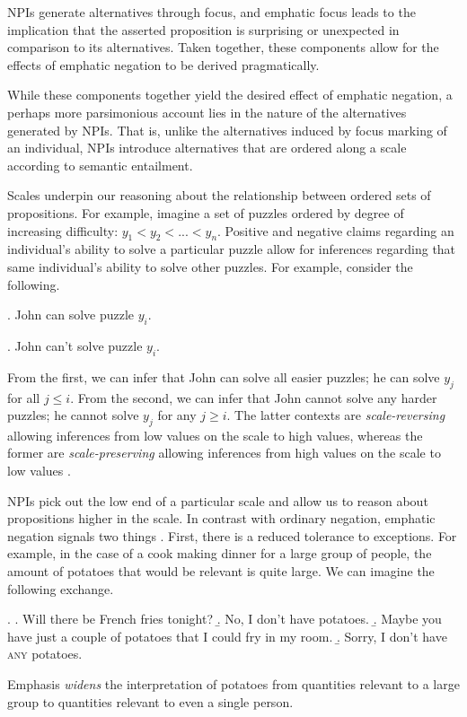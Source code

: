 \documentclass[12pt]{article}
\theoremstyle{definition} \newtheorem{definition}{Definition}
\begin{document}
NPIs generate alternatives through focus, and emphatic focus leads to the implication that the asserted proposition is surprising or unexpected in comparison to its alternatives. Taken together, these components allow for the effects of emphatic negation to be derived pragmatically.

While these components together yield the desired effect of emphatic negation, a perhaps more parsimonious account lies in the nature of the alternatives generated by NPIs. That is, unlike the alternatives induced by focus marking of an individual, NPIs introduce alternatives that are ordered along a scale according to semantic entailment.

Scales underpin our reasoning about the relationship between ordered sets of propositions. For example, imagine a set of puzzles ordered by degree of increasing difficulty: $y_1 < y_2 < ... < y_n$. Positive and negative claims regarding an individual's ability to solve a particular puzzle allow for inferences regarding that same individual's ability to solve other puzzles. For example, consider the following.

\ex. John can solve puzzle $y_i$.

\ex. John can't solve puzzle $y_i$.

From the first, we can infer that John can solve all easier puzzles; he can solve $y_j$ for all $j \leq i$. From the second, we can infer that John cannot solve any harder puzzles; he cannot solve $y_j$ for any $j \geq i$. The latter contexts are \emph{scale-reversing} allowing inferences from low values on the scale to high values, whereas the former are \emph{scale-preserving} allowing inferences from high values on the scale to low values \citep{fauconnier1975}.

NPIs pick out the low end of a particular scale and allow us to reason about propositions higher in the scale. In contrast with ordinary negation, emphatic negation signals two things \citep{kadmon-landman1993any}. First, there is a reduced tolerance to exceptions. For example, in the case of a cook making dinner for a large group of people, the amount of potatoes that would be relevant is quite large. We can imagine the following exchange.

  \ex. \a. Will there be French fries tonight?
       \b. No, I don't have potatoes.
       \b. Maybe you have just a couple of potatoes that I could fry in my room.
       \b. Sorry, I don't have \textsc{any} potatoes.

Emphasis \emph{widens} the interpretation of potatoes from quantities relevant to a large group to quantities relevant to even a single person.
 
\end{document}
